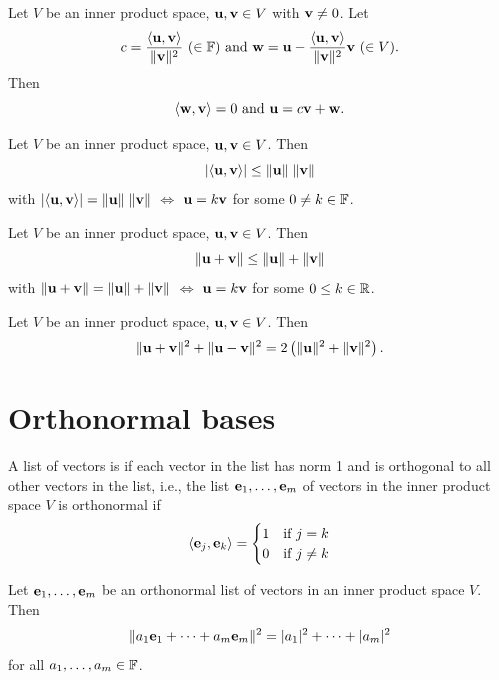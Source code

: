\documentclass[aspectratio=169]{beamer}
\begin{document}
\begin{frame}
\begin{theorem}
Let $V$ be an inner product space, $\mathbf{u},\mathbf{v}\in V$ with $\mathbf{v}\neq 0$. Let 
\[
c=\frac{\langle\mathbf{u},\mathbf{v}\rangle}{\|\mathbf{v}\|^2}
\ (\in\mathbb{F})
\textrm{ and }
\mathbf{w}=\mathbf{u}-\frac{\langle\mathbf{u},\mathbf{v}\rangle}{\|\mathbf{v}\|^2}\mathbf{v}
\ (\in V).
\]
Then
\[
\langle\mathbf{w},\mathbf{v}\rangle =0 \textrm{ and }\mathbf{u}=c\mathbf{v}+\mathbf{w}.
\]
\end{theorem}
\begin{importanttheorem}
Let $V$ be an inner product space, $\mathbf{u},\mathbf{v}\in V$. 
Then
\[
|\langle\mathbf{u},\mathbf{v}\rangle|\leq \|\mathbf{u}\|\;\|\mathbf{v}\|
\]
with $|\langle\mathbf{u},\mathbf{v}\rangle|= \|\mathbf{u}\|\;\|\mathbf{v}\|$ $\Leftrightarrow$ $\mathbf{u}=k\mathbf{v}$ for some $0\neq k\in\mathbb{F}$.
\end{importanttheorem}
\end{frame}

\begin{frame}
\begin{importanttheorem}
Let $V$ be an inner product space, $\mathbf{u},\mathbf{v}\in V$. 
Then
\[
\|\mathbf{u}+\mathbf{v}\|\leq \|\mathbf{u}\|+\|\mathbf{v}\|
\]
with $\|\mathbf{u}+\mathbf{v}\|= \|\mathbf{u}\|+\|\mathbf{v}\|$ $\Leftrightarrow$ $\mathbf{u}=k\mathbf{v}$ for some $0\leq k\in\mathbb{R}$.
\end{importanttheorem}
\vfill
\begin{theorem}
Let $V$ be an inner product space, $\mathbf{u},\mathbf{v}\in V$. 
Then
\[
\|\mathbf{u}+\mathbf{v}\|^2+\|\mathbf{u}-\mathbf{v}\|^2
=2\left(\|\mathbf{u}\|^2+\|\mathbf{v}\|^2\right).
\]
\end{theorem}
\end{frame}


\section{Orthonormal bases}

\begin{frame}
\begin{definition}
A list of vectors is  if each vector in the list has norm 1 and is orthogonal to all other vectors in the list, i.e., the list $\mathbf{e}_1,\ldots,\mathbf{e}_m$ of vectors in the inner product space $V$ is orthonormal if
\[
\langle \mathbf{e}_j,\mathbf{e}_k\rangle =
\begin{cases}
1 & \textrm{if }j=k \\
0 & \textrm{if }j\neq k
\end{cases}
\]
\end{definition}
\vfill
\begin{importanttheorem}
Let $\mathbf{e}_1,\ldots,\mathbf{e}_m$ be an orthonormal list of vectors in an inner product space $V$. Then
\[
\|a_1\mathbf{e}_1+\cdots+a_m\mathbf{e}_m\|^2=|a_1|^2+\cdots+|a_m|^2
\]
for all $a_1,\ldots,a_m\in\mathbb{F}$.
\end{importanttheorem}
\end{frame}
\end{document}
